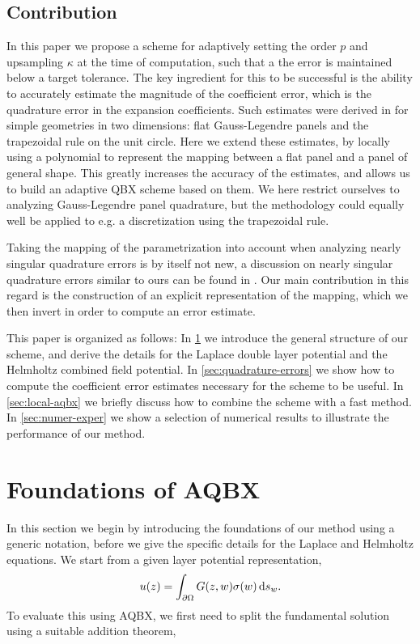 \documentclass[hidelinks]{siamart1116}
\begin{document}
\subsection{Contribution}

In this paper we propose a scheme for adaptively setting the order $p$
and upsampling ${\kappa}$ at the time of computation, such that a the
error is maintained below a target tolerance. The key ingredient for
this to be successful is the ability to accurately estimate the
magnitude of the coefficient error, which is the quadrature error in
the expansion coefficients. Such estimates were derived in
\cite{AfKlinteberg2016quad} for simple geometries in two dimensions:
flat Gauss-Legendre panels and the trapezoidal rule on the unit
circle. Here we extend these estimates, by locally using a polynomial
to represent the mapping between a flat panel and a panel of general
shape. This greatly increases the accuracy of the estimates, and
allows us to build an adaptive QBX scheme based on them. We here
restrict ourselves to analyzing Gauss-Legendre panel quadrature, but
the methodology could equally well be applied to e.g. a discretization
using the trapezoidal rule.

Taking the mapping of the parametrization into account when analyzing
nearly singular quadrature errors is by itself not new, a discussion
on nearly singular quadrature errors similar to ours can be found in
\cite{Barnett2014}. Our main contribution in this regard is the
construction of an explicit representation of the mapping, which
we then invert in order to compute an error estimate.

This paper is organized as follows: In \cref{sec:foundations-aqbx} we
introduce the general structure of our scheme, and derive the details
for the Laplace double layer potential and the Helmholtz combined
field potential. In \cref{sec:quadrature-errors} we show how to
compute the coefficient error estimates necessary for the scheme to be
useful. In \cref{sec:local-aqbx} we briefly discuss how to combine the
scheme with a fast method. In \cref{sec:numer-exper} we show a
selection of numerical results to illustrate the performance of our
method.

\section{Foundations of AQBX}
\label{sec:foundations-aqbx}

In this section we begin by introducing the foundations of our method
using a generic notation, before we give the specific details for the
Laplace and Helmholtz equations. We start from a given layer potential
representation,
\begin{align}
  u(z) = \int_{{\partial\Omega}} G(z, w) {\sigma}(w) \dif s_w .
\end{align}
To evaluate this using AQBX, we first need to split the fundamental
solution using a suitable addition theorem, 
\end{document}
